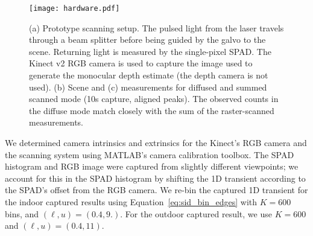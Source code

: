 
\begin{figure}[t]
	\centering
  \texttt{[image: hardware.pdf]}
  \caption{(a) Prototype scanning setup. The pulsed light from the laser travels
    through a beam splitter before being guided by the galvo to the scene.
    Returning light is measured by the single-pixel SPAD. The Kinect v2 RGB
    camera is used to capture the image used to generate the monocular depth
    estimate (the depth camera is not used). (b) Scene and (c) measurements for
    diffused and summed scanned mode (10s capture, aligned peaks). The observed
    counts in the diffuse mode match closely with the sum of the raster-scanned
    measurements.}
  \label{fig:hardware}
\end{figure}

We determined camera intrinsics and extrinsics for the Kinect's RGB camera and
the scanning system using MATLAB's camera calibration toolbox. 
The SPAD histogram and RGB image were captured from slightly different
viewpoints; we account for this in the SPAD histogram by shifting the 1D
transient according to the SPAD's offset from the RGB camera. We re-bin the
captured 1D transient for the indoor captured results
using Equation~\ref{eq:sid_bin_edges} with $K = 600$ bins, and $(\ell, u)=(0.4, 9.)$.
For the outdoor captured result, we use $K=600$ and $(\ell, u)=(0.4, 11)$.

